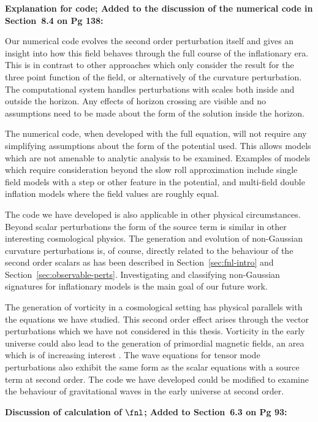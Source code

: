 \textbf{Explanation for code; Added to the discussion of the numerical code in Section~8.4 on Pg
138:}

Our numerical code evolves the second order perturbation itself and gives an insight into how this
field behaves through the full course of the inflationary era. This is in contrast to other
approaches which only consider the result for the three point function of the field, or
alternatively of the curvature perturbation.
% 
The computational system handles perturbations with scales both inside and outside the horizon. Any
effects of horizon crossing are visible and no assumptions need to be made about the form of the
solution inside the horizon.

The numerical code, when developed with the full equation, will not require any simplifying
assumptions about the form of the potential used. This allows models which are not amenable to
analytic analysis to be examined. Examples of models which require consideration beyond the slow
roll approximation include single field models with a step or other feature in the potential, and
multi-field double inflation models where the field values are roughly equal.


The code we have developed is also applicable in other physical circumstances. Beyond scalar
perturbations the form of the source term is similar in other interesting cosmological physics. 
The generation and evolution of non-Gaussian curvature perturbations is, of course, directly related
to the behaviour of the second order scalars as has been described in Section~\ref{sec:fnl-intro}
and Section~\ref{sec:observable-perts}. Investigating and classifying non-Gaussian signatures for
inflationary models is the main goal of our future work.

The generation of vorticity in a cosmological setting has physical parallels with the equations we
have studied. This second order effect arises through the vector perturbations which we have not
considered in this thesis. Vorticity in the early universe could also lead to the generation of
primordial magnetic fields, an area which is of increasing interest
\cite{Christopherson:2009bt,1950ZNatA...5...65B}.
% 
The wave equations for tensor mode perturbations also exhibit the same form as the scalar equations
with a source term at second order. The code we have developed could be modified to examine the
behaviour of gravitational waves in the early universe at second order.

\textbf{Discussion of calculation of $\fnl$; Added to Section~6.3 on Pg 93:}

